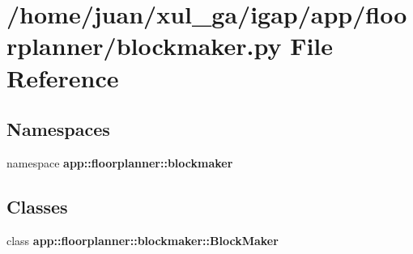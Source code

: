 \section{/home/juan/xul\_\-ga/igap/app/floorplanner/blockmaker.py File Reference}
\label{blockmaker_8py}
\subsection*{Namespaces}
\begin{CompactItemize}
\item 
namespace {\bf app::floorplanner::blockmaker}
\end{CompactItemize}
\subsection*{Classes}
\begin{CompactItemize}
\item 
class {\bf app::floorplanner::blockmaker::BlockMaker}
\end{CompactItemize}
